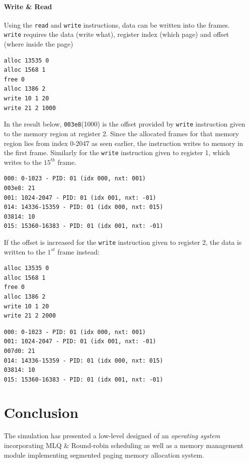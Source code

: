 \documentclass[]{article}
\begin{document}
\paragraph{Write \& Read}
Using the \lstinline|read| and \lstinline|write| instructions, data can be written into the frames. \lstinline|write| requires the data (write what), register index (which page) and offset (where inside the page)
\begin{lstlisting}
alloc 13535 0
alloc 1568 1
free 0
alloc 1386 2
write 10 1 20
write 21 2 1000
\end{lstlisting}
In the result below, \lstinline|003e8|(1000) is the offset provided by \lstinline|write| instruction given to the memory region at register 2. Since the allocated frames for that memory region lies from index 0-2047 as seen earlier, the instruction writes to memory in the first frame. Similarly for the \lstinline|write| instruction given to register 1, which writes to the $15^{th}$ frame.
\begin{lstlisting}
000: 0-1023 - PID: 01 (idx 000, nxt: 001)
003e8: 21
001: 1024-2047 - PID: 01 (idx 001, nxt: -01)
014: 14336-15359 - PID: 01 (idx 000, nxt: 015)
03814: 10
015: 15360-16383 - PID: 01 (idx 001, nxt: -01)
\end{lstlisting}
If the offset is increased for the \lstinline|write| instruction given to register 2, the data is written to the $1^{st}$ frame instead:
\begin{lstlisting}
alloc 13535 0
alloc 1568 1
free 0
alloc 1386 2
write 10 1 20
write 21 2 2000
\end{lstlisting}
\begin{lstlisting}
000: 0-1023 - PID: 01 (idx 000, nxt: 001)
001: 1024-2047 - PID: 01 (idx 001, nxt: -01)
007d0: 21
014: 14336-15359 - PID: 01 (idx 000, nxt: 015)
03814: 10
015: 15360-16383 - PID: 01 (idx 001, nxt: -01)
\end{lstlisting}
\section{Conclusion}
The simulation has presented a low-level designed of an \textit{operating system} incorporating MLQ \& Round-robin scheduling as well as a memory management module implementing segmented paging memory allocation system.
\end{document}
